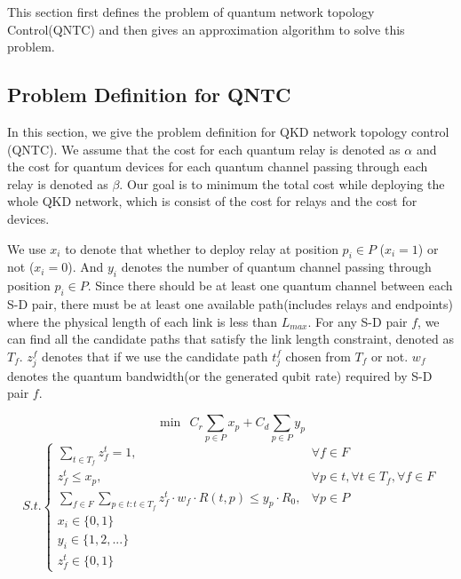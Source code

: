 This section first defines the problem of quantum network topology Control(QNTC) and then gives an approximation algorithm to solve this problem.

\subsection{Problem Definition for QNTC}
In this section, we give the problem definition for QKD network topology control (QNTC). We assume that the cost for each quantum relay is denoted as $\alpha$ and the cost for quantum devices for each quantum channel passing through each relay is denoted as $\beta$. Our goal is to minimum the total cost while deploying the whole QKD network, which is consist of the cost for relays and the cost for devices.

 We use $x_i$ to denote that whether to deploy relay at position $p_i \in P$ ($x_i = 1 $) or not ($x_i = 0$). And $y_i$ denotes the number of quantum channel passing through position $p_i \in P$. Since there should be at least one quantum channel between each S-D pair, there must be at least one available path(includes relays and endpoints) where the physical length of each link is less than $L_{max}$. For any S-D pair $f$, we can find all the candidate paths that satisfy the link length constraint, denoted as $T_f$. $z_j^f$ denotes that if we use the candidate path $t_j^f$ chosen from $T_f$ or not. $w_f$ denotes the quantum bandwidth(or the generated qubit rate) required by S-D pair $f$.

{\small
	\begin{equation*}
	\min \ \  C_r\sum_{p \in P}{x_p} + C_d\sum_{p \in P}{y_p}
	\end{equation*}
	\begin{equation}\label{eq:int}
	{S.t.}\begin{cases}
     \sum_{t \in T_f}{z_f^t} = 1, & \forall f \in F \\
     z_f^t \le x_p, & \forall p \in t, \forall t \in T_f, \forall f \in F \\
     \sum_{f \in F}\sum_{p \in t:t \in T_f}{z_f^t \cdot w_f \cdot R(t,p)} \le  y_p \cdot R_0, & \forall p \in P \\
	 x_i \in \{0, 1\}\\
     y_i \in \{1,2,...\}\\
     z_f^t \in \{0,1\}

	\end{cases}
	\end{equation}
}


